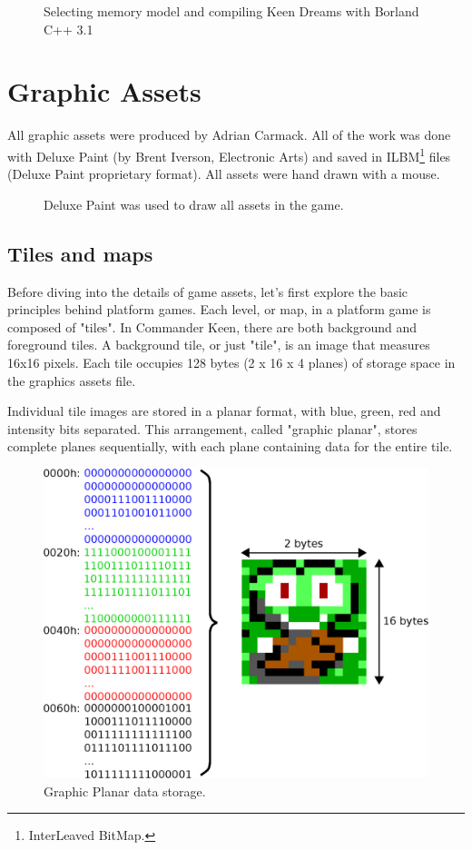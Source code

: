 \documentclass[book.tex]{subfiles}
\begin{document}
\par
\begin{figure}[H]
\centering
  \caption{Selecting memory model and compiling Keen Dreams with Borland C++ 3.1}
\end{figure}




\section{Graphic Assets}
\label{section:graphic_assets}

All graphic assets were produced by Adrian Carmack. All of the work was done with Deluxe Paint (by Brent Iverson, Electronic Arts) and saved in ILBM\footnote{InterLeaved BitMap.} files (Deluxe Paint proprietary format). All assets were hand drawn with a mouse.

\begin{figure}[H]
  \centering
 \caption{Deluxe Paint was used to draw all assets in the game.}
\end{figure}

\subsection{Tiles and maps}
Before diving into the details of game assets, let's first explore the basic principles behind platform games. Each level, or map, in a platform game is composed of "tiles". In Commander Keen, there are both background and foreground tiles. A background tile, or just "tile", is an image that measures 16x16 pixels. Each tile occupies 128 bytes (2 x 16 x 4 planes) of storage space in the graphics assets file.\\

\par
Individual tile images are stored in a planar format, with blue, green, red and intensity bits separated. This arrangement, called "graphic planar", stores complete planes sequentially, with each plane containing data for the entire tile.\\

\par
\begin{figure}[H]
\centering
 \includegraphics[width=.8\textwidth]{imgs/drawings/Tile_RGBI.eps}
 \caption{Graphic Planar data storage.}
 \label{graphic_planar}
\end{figure}
\end{document}
